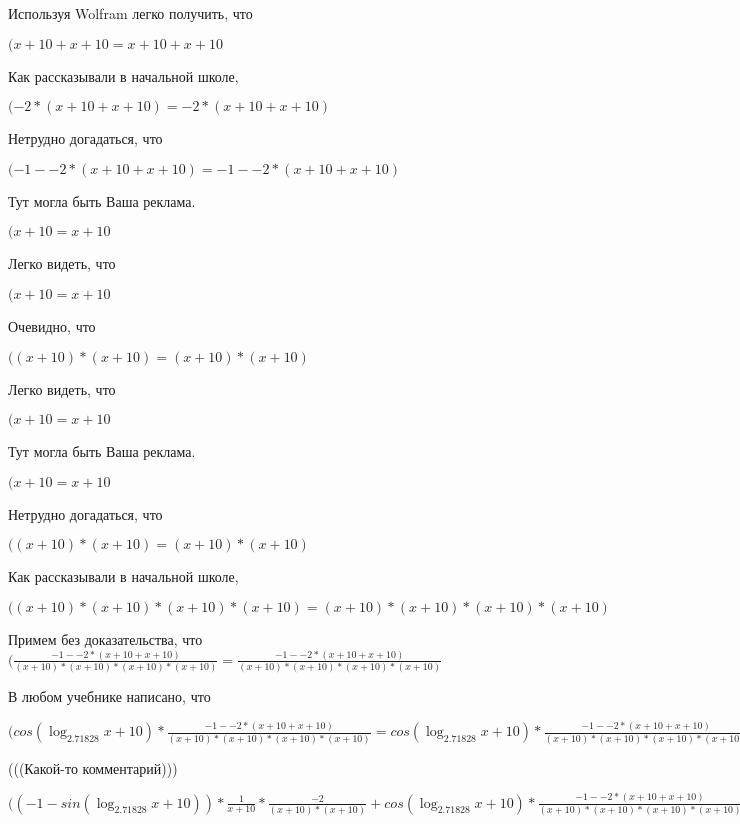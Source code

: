 \documentclass[12pt,a4paper,fleqn]{article}
\theoremstyle{definition}
\begin{document}
Используя Wolfram легко получить, что

$( x  +  10  +  x  +  10  =  x  +  10  +  x  +  10 $

Как рассказывали в начальной школе,

$( -2  * ( x  +  10  +  x  +  10 ) =  -2  * ( x  +  10  +  x  +  10 )$

Нетрудно догадаться, что

$( -1  -  -2  * ( x  +  10  +  x  +  10 ) =  -1  -  -2  * ( x  +  10  +  x  +  10 )$

Тут могла быть Ваша реклама.

$( x  +  10  =  x  +  10 $

Легко видеть, что

$( x  +  10  =  x  +  10 $

Очевидно, что

$(( x  +  10 ) * ( x  +  10 ) = ( x  +  10 ) * ( x  +  10 )$

Легко видеть, что

$( x  +  10  =  x  +  10 $

Тут могла быть Ваша реклама.

$( x  +  10  =  x  +  10 $

Нетрудно догадаться, что

$(( x  +  10 ) * ( x  +  10 ) = ( x  +  10 ) * ( x  +  10 )$

Как рассказывали в начальной школе,

$(( x  +  10 ) * ( x  +  10 ) * ( x  +  10 ) * ( x  +  10 ) = ( x  +  10 ) * ( x  +  10 ) * ( x  +  10 ) * ( x  +  10 )$

Примем без доказательства, что
$(\frac{ -1  -  -2  * ( x  +  10  +  x  +  10 )}{( x  +  10 ) * ( x  +  10 ) * ( x  +  10 ) * ( x  +  10 )}
 = \frac{ -1  -  -2  * ( x  +  10  +  x  +  10 )}{( x  +  10 ) * ( x  +  10 ) * ( x  +  10 ) * ( x  +  10 )}
$

В любом учебнике написано, что

$(cos(\log_{ 2.71828 }{ x  +  10 }) * \frac{ -1  -  -2  * ( x  +  10  +  x  +  10 )}{( x  +  10 ) * ( x  +  10 ) * ( x  +  10 ) * ( x  +  10 )}
 = cos(\log_{ 2.71828 }{ x  +  10 }) * \frac{ -1  -  -2  * ( x  +  10  +  x  +  10 )}{( x  +  10 ) * ( x  +  10 ) * ( x  +  10 ) * ( x  +  10 )}
$

(((Какой-то комментарий)))

$(( -1  - sin(\log_{ 2.71828 }{ x  +  10 })) * \frac{ 1 }{ x  +  10 }
 * \frac{ -2 }{( x  +  10 ) * ( x  +  10 )}
 + cos(\log_{ 2.71828 }{ x  +  10 }) * \frac{ -1  -  -2  * ( x  +  10  +  x  +  10 )}{( x  +  10 ) * ( x  +  10 ) * ( x  +  10 ) * ( x  +  10 )}
 = ( -1  - sin(\log_{ 2.71828 }{ x  +  10 })) * \frac{ 1 }{ x  +  10 }
 * \frac{ -2 }{( x  +  10 ) * ( x  +  10 )}
 + cos(\log_{ 2.71828 }{ x  +  10 }) * \frac{ -1  -  -2  * ( x  +  10  +  x  +  10 )}{( x  +  10 ) * ( x  +  10 ) * ( x  +  10 ) * ( x  +  10 )}
$
\end{document}
